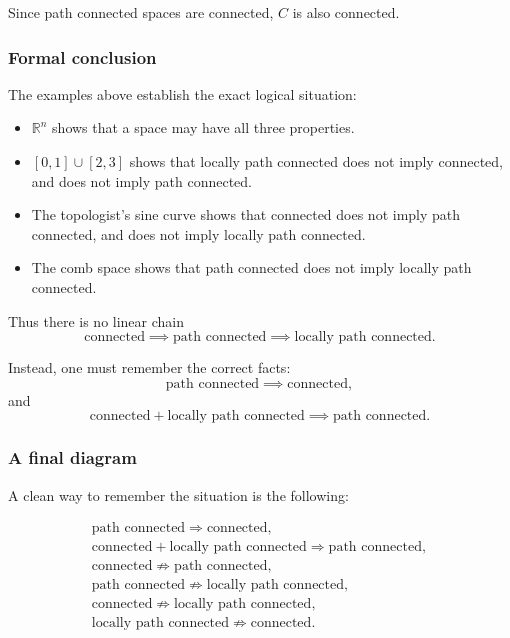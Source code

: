 \documentclass[12pt,a4paper]{article}
\theoremstyle{notespace}
\begin{document}
Since path connected spaces are connected, \(C\) is also connected.

\subsubsection{Formal conclusion}

The examples above establish the exact logical situation:

\begin{itemize}
	\item \(\mathbb{R}^n\) shows that a space may have all three properties.
	\item \([0,1]\cup[2,3]\) shows that locally path connected does not imply connected, and does not imply path connected.
	\item The topologist's sine curve shows that connected does not imply path connected, and does not imply locally path connected.
	\item The comb space shows that path connected does not imply locally path connected.
\end{itemize}

Thus there is no linear chain
\[
\text{connected} \implies \text{path connected} \implies \text{locally path connected}.
\]

Instead, one must remember the correct facts:
\[
\text{path connected} \implies \text{connected},
\]
and
\[
\text{connected}+\text{locally path connected} \implies \text{path connected}.
\]

\subsubsection{A final diagram}

A clean way to remember the situation is the following:

\[
\begin{array}{c}
	\text{path connected} \Longrightarrow \text{connected},\\[10pt]
	\text{connected}+\text{locally path connected} \Longrightarrow \text{path connected},\\[10pt]
	\text{connected} \not\Rightarrow \text{path connected},\\[6pt]
	\text{path connected} \not\Rightarrow \text{locally path connected},\\[6pt]
	\text{connected} \not\Rightarrow \text{locally path connected},\\[6pt]
	\text{locally path connected} \not\Rightarrow \text{connected}.
\end{array}
\]
\end{document}
